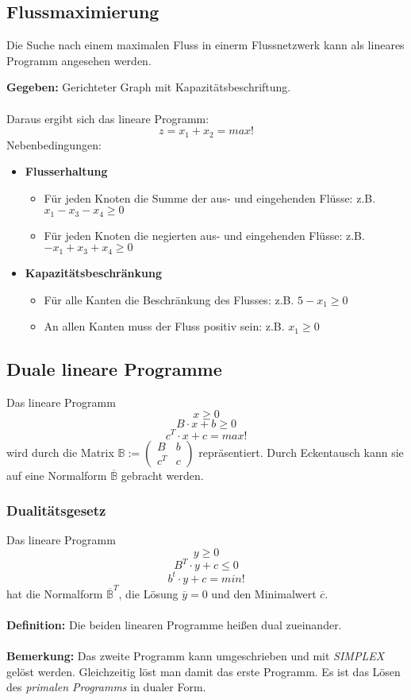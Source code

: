 \subsection{Flussmaximierung}
Die Suche nach einem maximalen Fluss in einerm Flussnetzwerk kann als lineares Programm angesehen werden.

\textbf{Gegeben:} Gerichteter Graph mit Kapazitätsbeschriftung.
\\\\
Daraus ergibt sich das lineare Programm:
\[z = x_1 + x_2 = max!\]
Nebenbedingungen:
\begin{itemize}
	\item \textbf{Flusserhaltung}
	\begin{itemize}
		\item Für jeden Knoten die Summe der aus- und eingehenden Flüsse: z.B. \(x_1-x_3-x_4 \geq 0\)
		\item Für jeden Knoten die negierten aus- und eingehenden Flüsse: z.B. \(-x_1+x_3+x_4 \geq 0\)
	\end{itemize}
	\item \textbf{Kapazitätsbeschränkung}
	\begin{itemize}
		\item Für alle Kanten die Beschränkung des Flusses: z.B. \(5-x_1 \geq 0\)
		\item An allen Kanten muss der Fluss positiv sein: z.B. \(x_1 \geq 0\)
	\end{itemize}
\end{itemize}


\subsection{Duale lineare Programme}
Das lineare Programm
\[x \geq 0\]
\[B\cdot x + b \geq 0\]
\[c^T \cdot x + c = max!\]
wird durch die Matrix \(\mathbb{B} := \begin{pmatrix} B & b \\ c^T & c\end{pmatrix}\) repräsentiert. Durch Eckentausch kann sie auf eine Normalform \(\overline{\mathbb{B}}\) gebracht werden.

\subsubsection{Dualitätsgesetz}
Das lineare Programm
\[y \geq 0\]
\[B^T \cdot y + c \leq 0\]
\[b^t \cdot y + c = min!\]
hat die Normalform \(\overline{\mathbb{B}}^T\), die Lösung \(\overline{y}=0\) und den Minimalwert \(\overline{c}\).
\\\\
\textbf{Definition:} Die beiden linearen Programme heißen dual zueinander.
\\\\
\textbf{Bemerkung:} Das zweite Programm kann umgeschrieben und mit \textit{SIMPLEX} gelöst werden. Gleichzeitig löst man damit das erste Programm. Es ist das Lösen des \textit{primalen Programms} in dualer Form.


